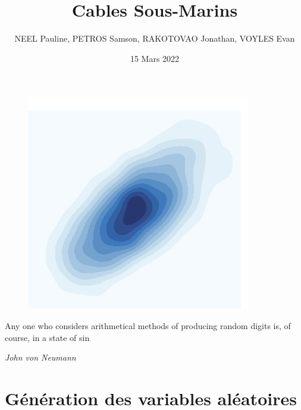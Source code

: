 \documentclass[10pt]{article} %
\title{Cables Sous-Marins}
\author{NEEL Pauline, PETROS Samson, RAKOTOVAO Jonathan, VOYLES Evan}
\date{15 Mars 2022}
\begin{document}
\begin{titlepage}

\maketitle

\begin{figure}[h!]
    \centering
    \includegraphics{media/plot.png}
\end{figure}

\vspace{3cm}





\epigraph{Any one who considers arithmetical methods of producing random digits is, of course, in a state of sin}
 {\textit{John von Neumann}}

\newpage

\end{titlepage}

\pagestyle{fancy}

\section{Génération des variables aléatoires}
\end{document}
